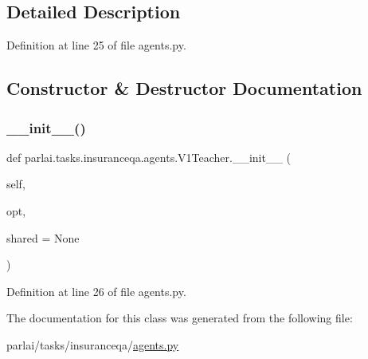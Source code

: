 \subsection{Detailed Description}


Definition at line 25 of file agents.\+py.



\subsection{Constructor \& Destructor Documentation}
\mbox{\label{classparlai_1_1tasks_1_1insuranceqa_1_1agents_1_1V1Teacher_aa41a7ca1c1c437a0d1bb4bf93549446a}} 
\subsubsection{\texorpdfstring{\+\_\+\+\_\+init\+\_\+\+\_\+()}{\_\_init\_\_()}}
{\footnotesize\ttfamily def parlai.\+tasks.\+insuranceqa.\+agents.\+V1\+Teacher.\+\_\+\+\_\+init\+\_\+\+\_\+ (\begin{DoxyParamCaption}\item[{}]{self,  }\item[{}]{opt,  }\item[{}]{shared = {\ttfamily None} }\end{DoxyParamCaption})}



Definition at line 26 of file agents.\+py.



The documentation for this class was generated from the following file\+:\begin{DoxyCompactItemize}
\item 
parlai/tasks/insuranceqa/\hyperlink{parlai_2tasks_2insuranceqa_2agents_8py}{agents.\+py}\end{DoxyCompactItemize}
